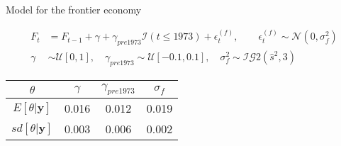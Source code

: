 \documentclass[notes,blackandwhite,mathsans,usenames,dvipsnames]{beamer}
\begin{document}
\begin{frame}{Model for the frontier economy}

\begin{align*}
F_t &= F_{t-1} + \gamma +\gamma_{pre 1973}\mathcal{I}(t\leq 1973) + \epsilon_t^{(f)},\qquad\epsilon_t^{(f)} \sim\mathcal{N}\left( 0,\sigma_f^2 \right)\\[1ex]
\gamma &\sim\mathcal{U}[0,1], \quad
\gamma_{pre 1973} \sim\mathcal{U}[-0.1,0.1],\quad
\sigma_f^2 \sim\mathcal{IG}2(\hat{s}^2,3)
\end{align*}

\bigskip\begin{center}
\begin{tabular}{cccc}
\toprule
$\theta$&$\gamma$ & $\gamma_{pre1973}$ & $\sigma_f$\\
\midrule
$E[\theta|\mathbf{y}]$ &0.016 &0.012 &0.019\\
$sd[\theta|\mathbf{y}]$ &0.003& 0.006& 0.002\\
\bottomrule
\end{tabular}
\end{center}
\end{frame}
\end{document}
